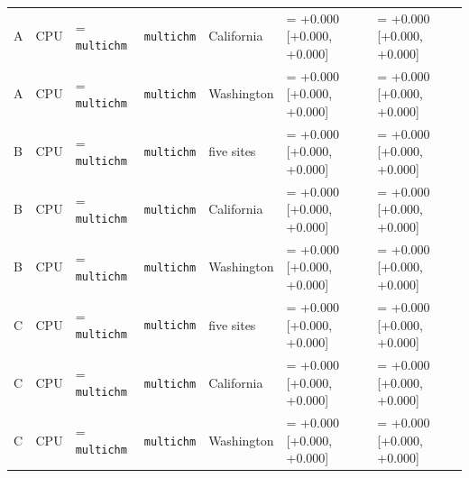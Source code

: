 \documentclass[10pt,a4paper]{article}
\begin{document}
{\begin{xltabular}{\textwidth}{ll>{\hsize\linewidth=\hsize}Lll>{\hsize\linewidth=\hsize}L>{\hsize\linewidth=\hsize}L}
A & CPU & \texttt{multichm} & \texttt{multichm} & California & +0.000 [+0.000, +0.000] & +0.000 [+0.000, +0.000] \\
A & CPU & \texttt{multichm} & \texttt{multichm} & Washington & +0.000 [+0.000, +0.000] & +0.000 [+0.000, +0.000] \\
B & CPU & \texttt{multichm} & \texttt{multichm} & five sites & +0.000 [+0.000, +0.000] & +0.000 [+0.000, +0.000] \\
B & CPU & \texttt{multichm} & \texttt{multichm} & California & +0.000 [+0.000, +0.000] & +0.000 [+0.000, +0.000] \\
B & CPU & \texttt{multichm} & \texttt{multichm} & Washington & +0.000 [+0.000, +0.000] & +0.000 [+0.000, +0.000] \\
C & CPU & \texttt{multichm} & \texttt{multichm} & five sites & +0.000 [+0.000, +0.000] & +0.000 [+0.000, +0.000] \\
C & CPU & \texttt{multichm} & \texttt{multichm} & California & +0.000 [+0.000, +0.000] & +0.000 [+0.000, +0.000] \\
C & CPU & \texttt{multichm} & \texttt{multichm} & Washington & +0.000 [+0.000, +0.000] & +0.000 [+0.000, +0.000] \\
\end{xltabular}
}
\end{document}
